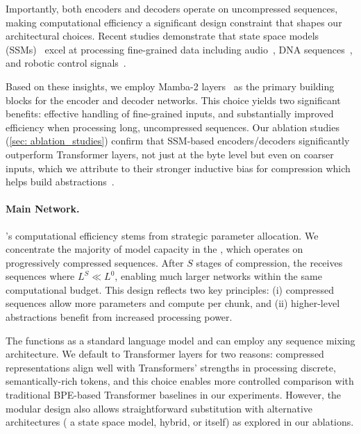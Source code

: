 Importantly, both encoders and decoders operate on uncompressed sequences, making computational efficiency a significant design constraint that shapes our architectural choices.
Recent studies demonstrate that state space models (SSMs)~\citep{S4, Mamba} excel at processing fine-grained data including audio~\citep{SaShiMi}, DNA sequences~\citep{Caduceus}, and robotic control signals~\citep{ssm-rl}.

Based on these insights, we employ Mamba-2 layers~\citep{Mamba2} as the primary building blocks for the encoder and decoder networks.
This choice yields two significant benefits: effective handling of fine-grained inputs, and substantially improved efficiency when processing long, uncompressed sequences.
Our ablation studies (\cref{sec: ablation_studies}) confirm that SSM-based encoders/decoders significantly outperform Transformer layers,
not just at the byte level but even on coarser inputs, which we attribute to their stronger inductive bias for compression which helps build abstractions~\citep{gu2025tradeoffs}.

\paragraph{Main Network.}

\model{}'s computational efficiency stems from strategic parameter allocation.
We concentrate the majority of model capacity in the \main{}, which operates on progressively compressed sequences.
After $S$ stages of compression, the \main{} receives sequences where $L^S \ll L^0$, enabling much larger networks within the same computational budget.
This design reflects two key principles: (i) compressed sequences allow more parameters and compute per chunk, and (ii) higher-level abstractions benefit from increased processing power.

The \main{} functions as a standard language model and can employ any sequence mixing architecture.
We default to Transformer layers for two reasons: compressed representations align well with Transformers' strengths in processing discrete, semantically-rich tokens, and this choice enables more controlled comparison with traditional BPE-based Transformer baselines in our experiments.
However, the modular design also allows straightforward substitution with alternative architectures (\eg{} a state space model, hybrid,  or \model{} itself) as explored in our ablations.


